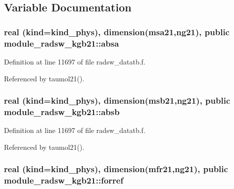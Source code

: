 \subsection{Variable Documentation}
\subsubsection[{\texorpdfstring{absa}{absa}}]{\setlength{\rightskip}{0pt plus 5cm}real (kind=kind\+\_\+phys), dimension({\bf msa21},ng21), public module\+\_\+radsw\+\_\+kgb21\+::absa}\hypertarget{namespacemodule__radsw__kgb21_a7cce83c282d3efec6a3fe319480c270a}{}\label{namespacemodule__radsw__kgb21_a7cce83c282d3efec6a3fe319480c270a}


Definition at line 11697 of file radsw\+\_\+datatb.\+f.



Referenced by taumol21().

\subsubsection[{\texorpdfstring{absb}{absb}}]{\setlength{\rightskip}{0pt plus 5cm}real (kind=kind\+\_\+phys), dimension({\bf msb21},ng21), public module\+\_\+radsw\+\_\+kgb21\+::absb}\hypertarget{namespacemodule__radsw__kgb21_a1d3f12f050c90be49f109205c463b29b}{}\label{namespacemodule__radsw__kgb21_a1d3f12f050c90be49f109205c463b29b}


Definition at line 11697 of file radsw\+\_\+datatb.\+f.



Referenced by taumol21().

\subsubsection[{\texorpdfstring{forref}{forref}}]{\setlength{\rightskip}{0pt plus 5cm}real (kind=kind\+\_\+phys), dimension({\bf mfr21},ng21), public module\+\_\+radsw\+\_\+kgb21\+::forref}\hypertarget{namespacemodule__radsw__kgb21_ac93d473e0309275f03a89b161377a034}{}\label{namespacemodule__radsw__kgb21_ac93d473e0309275f03a89b161377a034}


